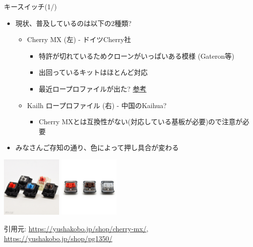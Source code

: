 \documentclass[cjk,dvipdfmx,10pt,compress,fragile%
hyperref={bookmarks=true,bookmarksnumbered=true,bookmarksopen=false,%
colorlinks=false,%
pdftitle={第 134 回 関西 Debian 勉強会},%
pdfauthor={小林},%
pdfsubject={資料},%
}]{beamer}
\begin{document}
\begin{frame}[fragile,t]{キースイッチ(1/)}
 \begin{itemize}
  \item 現状、普及しているのは以下の2種類?
	\begin{itemize}
	 \item Cherry MX (左)  - ドイツCherry社
	       \begin{itemize}
		\item 特許が切れているためクローンがいっぱいある模様 (Gateron等)
		\item 出回っているキットはほとんど対応
		\item 最近ロープロファイルが出た? \href{https://www.cherrymx.de/en/mx-low-profile/mx-low-profile-red.html}{参考}
	       \end{itemize}
	 \item Kailh ロープロファイル (右) - 中国のKaihua?
	       \begin{itemize}
		\item Cherry MXとは互換性がない(対応している基板が必要)ので注意が必要
	       \end{itemize}
	\end{itemize}
  \item みなさんご存知の通り、色によって押し具合が変わる
 \end{itemize}
 \begin{center}
  \includegraphics[keepaspectratio,height=3cm]{./img/Cherry_MX-1.jpg}
  \hspace*{1zw}
  \includegraphics[keepaspectratio,height=3cm]{./img/YKB0003S.jpg}
 \end{center}
 \vspace{-1zw}
 \begin{flushright}
  \footnotesize
  引用元: \url{https://yushakobo.jp/shop/cherry-mx/}, \url{https://yushakobo.jp/shop/pg1350/}
 \end{flushright}
\end{frame}
\end{document}
